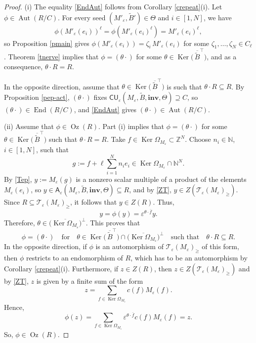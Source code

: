 \documentclass[11pt]{amsart}
\theoremstyle{plain}
\newcommand \thref[1]{Theorem \ref{t#1}}
\newcommand \prref[1]{Proposition \ref{p#1}}
\newcommand \coref[1]{Corollary \ref{c#1}}
\def \Zset {{\mathbb Z}}
\def \Nset {{\mathbb N}}
\def \A {{\boldsymbol{\mathsf A}}}
\def \C {{\boldsymbol{\mathsf C}}}
\def \U {{\boldsymbol{\mathsf U}}}
\def \B  {{\widetilde{B}}}
\newcommand \inv {{\mathbf{inv}}}
\def \TT {{\mathcal{T}}}
\def \Om {\Omega}
\def \ep {\varepsilon}
\def \ol {\overline}
\DeclareMathOperator \Aut { {\mathrm{Aut}} }
\DeclareMathOperator \Oz { {\mathrm{Oz}}}
\DeclareMathOperator \Ker { {\mathrm{Ker}} }
\DeclareMathOperator \End { {\mathrm{End}} }
\begin{document}
\begin{proof} (i) The equality \eqref{EndAut} follows from \coref{repeat}(i). 
Let $\phi \in \Aut(R/C)$. For every seed $(M'_\ep, \B') \in \Theta$ and $i \in [1,N]$, we have
\[
\phi(M'_\ep(e_i))^\ell = \phi(M'_\ep( e_i)^\ell) = M'_\ep(e_i)^\ell,
\] 
so \prref{main} gives $\phi(M'_\ep(e_i)) = \zeta_i\, M'_\ep(e_i)$ for some $\zeta_1, \ldots, \zeta_N \in C_\ell$. \thref{nerve} implies that $\phi = (\theta \cdot)$ for some 
$\theta \in \Ker \big( \, \ol{\B}^\top \big)$, and as a consequence, $\theta \cdot R = R$. 

In the opposite direction, assume that $\theta \in \Ker \big( \, \ol{\B}^\top \big)$ is such that $\theta \cdot R \subseteq R$. By \prref{ep-act}, $(\theta \cdot)$ fixes
$\C\U_\ep(M_\ep, \B, \inv, \Theta) \supseteq C$, so $(\theta \cdot) \in \End(R/C)$,
and \eqref{EndAut} gives $(\theta \cdot) \in \Aut(R/C)$.

(ii) Assume that $\phi \in \Oz(R)$. Part (i) implies that 
$\phi = (\theta \cdot)$ for some 
$\theta \in \Ker \big( \, \ol{\B}^\top \big)$ such that 
$\theta \cdot R = R$. 
Take $f \in \Ker \Om_{M_\ep} \subset \Zset^N$. Choose $n_i \in \Nset$, $i \in [1,N]$, such that
\[
g := f + \ell \sum_{i=1}^N n_i e_i \in 
\Ker \Om_{M_\ep} \cap \Nset^N.
\]
By \eqref{Tep}, $y := M_\ep(g)$ is a nonzero scalar
multiple of a product of the elements $M_\ep(e_i)$, so
$y \in \A_\ep(M_\ep, \B, \inv, \Theta) \subseteq R$, and by \eqref{ZT},
$y \in Z(\TT_\ep(M_\ep)_\geq)$. Since $R \subseteq \TT_\ep(M_\ep)_\geq$, it follows that
$y \in Z(R)$. Thus,
\[
y = \phi(y) = \ep^{\theta \cdot \ol{f}} y.
\]
Therefore, $\theta \in \Big( \ol{\Ker \Om_{M_\ep}} \Big)^\perp$. This proves that 
\[
\phi = (\theta \cdot) \quad 
\mbox{for} \quad 
\theta \in \Ker \big( \, \ol{\B}^\top \big) \cap \Big( 
\ol{\Ker \Om_{M_\ep}} \Big)^\perp \quad \mbox{such that} \quad \theta \cdot R \subseteq R.
\]
In the opposite direction, if $\phi$ is an automorphism 
of $\TT_\ep(M_\ep)_\geq$ of this form, then 
$\phi$ restricts to an endomorphism of $R$, which has to be an automorphism by \coref{repeat}(i). Furthermore, if $z \in Z(R)$, then $z \in Z(\TT_\ep(M_\ep)_\geq)$ and by \eqref{ZT}, $z$ is given by a finite sum of the form 
\[
z = \sum_{f \in \Ker \Om_{M_\ep}} c(f) M_\ep(f). 
\]
Hence, 
\[
\phi(z) = \sum_{f \in \Ker \Om_{M_\ep}} 
\ep^{\theta \cdot \ol{f}}
c(f) M_\ep(f) = z.
\]
So, $\phi \in \Oz(R)$.
\end{proof}
\end{document}
